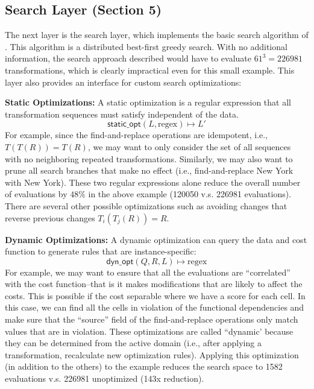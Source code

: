 \subsection{Search Layer (Section 5)} The next layer is the search layer, which implements the basic search algorithm of \sys. This algorithm is a distributed best-first greedy search.  
With no additional information, the search approach described would have to evaluate $61^3 = 226981$ transformations, which is clearly impractical even for this small example.
This layer also provides an interface for custom search optimizations:

\vspace{0.5em}\noindent\textbf{Static Optimizations: } A static optimization is a regular expression that all transformation sequences must satisfy independent of the data. 
\[\textsf{static\_opt}(L, \text{regex} ) \mapsto L'\]
For example, since the find-and-replace operations are idempotent, i.e., $T(T(R)) = T(R)$, we may want to only consider the set of all sequences with no neighboring repeated transformations. Similarly, we may also want to prune all search branches that make no effect (i.e., find-and-replace New York with New York).
These two regular expressions alone reduce the overall number of evaluations by $48\%$ in the above example (120050 v.s. 226981 evaluations).
There are several other possible optimizations  such as avoiding changes that reverse previous changes $T_i(T_j(R)) = R$.


\vspace{0.5em}\noindent\textbf{Dynamic Optimizations: } A dynamic optimization can query the data and cost function to generate rules that are instance-specific:
\[\textsf{dyn\_opt}(Q, R, L) \mapsto \text{regex}\]
For example, we may want to ensure that all the evaluations are ``correlated'' with the cost function--that is it makes modifications that are likely to affect the costs.
This is possible if the cost separable where we have a score for each cell. In this case, we can find all the cells in violation of the functional dependencies and make sure that the ``source'' field of the find-and-replace operations only match values that are in violation.
These optimizations are called ``dynamic' because they can be determined from the active domain (i.e., after applying a transformation, recalculate new optimization rules).
Applying this optimization (in addition to the others) to the example reduces the search space to 1582 evaluations v.s. 226981 unoptimized (143x reduction).

